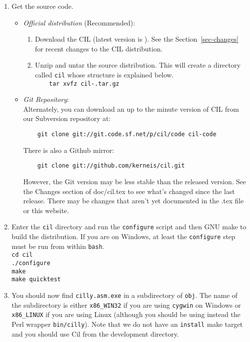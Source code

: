 \documentclass[letterpaper]{article}
\def\secref#1{Section~\ref{sec-#1}}
\newcommand{\hsp}{\hspace{0.5in}}
\def\t#1{{\tt #1}}
\begin{document}
\begin{enumerate}
\item Get the source code.
\begin{itemize}
\item {\em Official distribution} (Recommended):
\begin{enumerate}
\item Download the CIL
    (latest version is
    ).
    See the \secref{changes} for recent changes to the CIL distribution.
\item Unzip and untar the source distribution. This will create a directory
      called \t{cil} whose structure is explained below. \\
      \t{~~~~tar xvfz cil-\cilversion.tar.gz}
\end{enumerate}
\item {\em Git Repository}: \\
  Alternately, you can download an up to the minute version of CIL
  from our Subversion repository at:
\begin{verbatim}
    git clone git://git.code.sf.net/p/cil/code cil-code
\end{verbatim}
There is also a Github mirror:
\begin{verbatim}
    git clone git://github.com/kerneis/cil.git
\end{verbatim}
However, the Git version may be less stable than the released
version.  See the Changes section of doc/cil.tex to see what's
changed since the last release.  There may be changes that aren't yet
documented in the .tex file or this website.

\end{itemize}
\item Enter the \t{cil} directory and run the \t{configure} script and then 
      GNU make to build the distribution. If you are on Windows, at least the
      \t{configure} step must be run from within \t{bash}. \\
      \hsp\verb!cd cil!\\
      \hsp\verb!./configure!\\
      \hsp\verb!make!\\
      \hsp\verb!make quicktest!\\

\item You should now find \t{cilly.asm.exe} in a subdirectory of \t{obj}. The
name of the subdirectory is either \t{x86\_WIN32} if you are using \t{cygwin}
on Windows or \t{x86\_LINUX} if you are using Linux (although you should be
using instead the Perl wrapper \t{bin/cilly}). Note that we do not have an
\t{install} make target and you should use Cil from the development
directory.
\end{enumerate}
\end{document}
